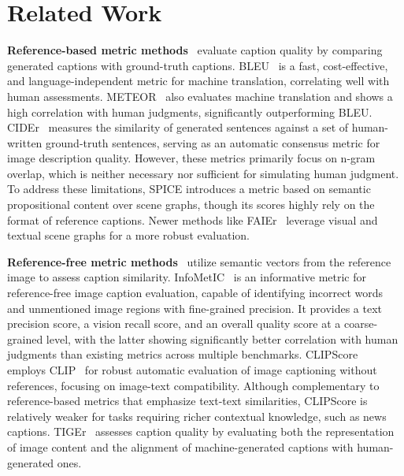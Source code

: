 \section{Related Work}
\label{sec:RelatedWork}

\textbf{Reference-based metric methods}~\cite{meteor, bleu, Spice, cider, Faier} evaluate caption quality by comparing generated captions with ground-truth captions. BLEU~\cite{bleu} is a fast, cost-effective, and language-independent metric for machine translation, correlating well with human assessments. METEOR~\cite{meteor} also evaluates machine translation and shows a high correlation with human judgments, significantly outperforming BLEU. CIDEr~\cite{cider} measures the similarity of generated sentences against a set of human-written ground-truth sentences, serving as an automatic consensus metric for image description quality. However, these metrics primarily focus on n-gram overlap, which is neither necessary nor sufficient for simulating human judgment. To address these limitations, SPICE introduces a metric based on semantic propositional content over scene graphs, though its scores highly rely on the format of reference captions.  Newer methods like FAIEr~\cite{Faier} leverage visual and textual scene graphs for a more robust evaluation.

\textbf{Reference-free metric methods}~\cite{infometic, Clipscore, Tiger} utilize semantic vectors from the reference image to assess caption similarity. InfoMetIC~\cite{infometic} is an informative metric for reference-free image caption evaluation, capable of identifying incorrect words and unmentioned image regions with fine-grained precision. It provides a text precision score, a vision recall score, and an overall quality score at a coarse-grained level, with the latter showing significantly better correlation with human judgments than existing metrics across multiple benchmarks. CLIPScore~\cite{Clipscore} employs CLIP~\cite{clip} for robust automatic evaluation of image captioning without references, focusing on image-text compatibility. Although complementary to reference-based metrics that emphasize text-text similarities, CLIPScore is relatively weaker for tasks requiring richer contextual knowledge, such as news captions. TIGEr~\cite{Tiger} assesses caption quality by evaluating both the representation of image content and the alignment of machine-generated captions with human-generated ones.



